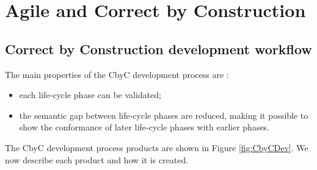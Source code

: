 
\chapter{Agile and Correct by Construction} %

\label{Chapter 2} %

\section{Correct by Construction development workflow}

The main properties of the CbyC development process are  \parencite{Tokeneer}:
\begin{itemize}
	\item each life-cycle phase can be validated;
	\item the semantic gap between life-cycle phases are reduced, making it possible
		to show the conformance of later life-cycle phases with earlier phases.
\end{itemize}

The CbyC development process products are shown in Figure \ref{fig:CbyCDev}. We now describe each product and how it is created.

